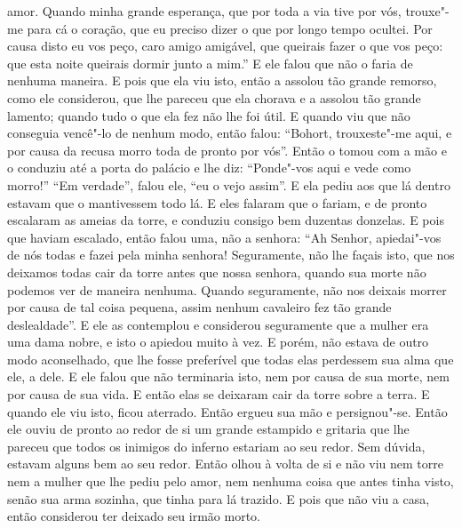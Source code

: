 amor. Quando minha grande esperança, que por toda a via tive por vós, trouxe"-me
para cá o coração, que eu preciso dizer o que por longo tempo ocultei. Por
causa disto eu vos peço, caro amigo amigável, que queirais fazer o que vos
peço: que esta noite queirais dormir junto a mim.” E ele falou que não o faria
de nenhuma maneira. E pois que ela viu isto, então a assolou tão grande
remorso, como ele considerou, que lhe pareceu que ela chorava e a assolou tão
grande lamento; quando tudo o que ela fez não lhe foi útil. E quando viu que
não conseguia vencê"-lo de nenhum modo, então falou: ``Bohort, trouxeste"-me aqui,
e por causa da recusa morro toda de pronto por vós”. Então o tomou com a mão e
o conduziu até a porta do palácio e lhe diz: “Ponde"-vos aqui e vede como
morro!” “Em verdade”, falou ele, “eu o vejo assim”. E ela pediu aos que lá
dentro estavam que o mantivessem todo lá. E eles falaram que o fariam, e de
pronto escalaram as ameias da torre, e conduziu consigo bem duzentas donzelas.
E pois que haviam escalado, então falou uma, não a senhora: “Ah Senhor,
apiedai"-vos de nós todas e fazei pela minha senhora! Seguramente, não lhe
façais isto, que nos deixamos todas cair da torre antes que nossa senhora,
quando sua morte não podemos ver de maneira nenhuma. Quando
seguramente, não nos deixais morrer por causa de tal coisa pequena, assim
nenhum cavaleiro fez tão grande deslealdade”. E ele as contemplou e considerou
seguramente que a mulher era uma dama nobre, e isto o apiedou muito à vez. E
porém, não estava de outro modo aconselhado, que lhe fosse preferível que todas
elas perdessem sua alma que ele, a dele. E ele falou que não terminaria isto,
nem por causa de sua morte, nem por causa de sua vida. E então
elas se deixaram cair da torre sobre a terra. E quando ele viu isto, ficou
aterrado. Então ergueu sua mão e persignou"-se. Então ele ouviu de pronto ao
redor de si um grande estampido e gritaria que lhe pareceu que todos os
inimigos do inferno estariam ao seu redor. Sem dúvida, estavam alguns bem ao
seu redor. Então olhou à volta de si e não viu nem torre nem a mulher que lhe
pediu pelo amor, nem nenhuma coisa que antes tinha visto, senão sua arma
sozinha, que tinha para lá trazido. E pois que não viu a casa, então considerou
ter deixado seu irmão morto. 


